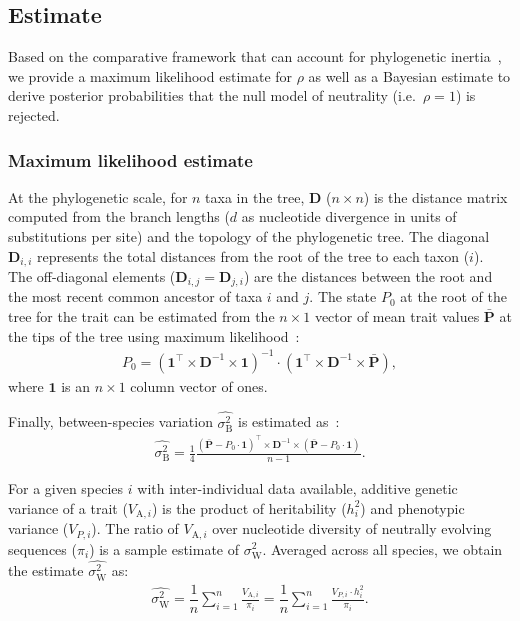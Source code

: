 \documentclass{article}
\newcommand{\Multiply}{\cdot}
\newcommand{\MultiplyMatrix}{\times}
\newcommand{\UniDimArray}[1]{\bm{#1}}
\newcommand{\BiDimArray}[1]{\bm{#1}}
\newcommand{\tr}{^{\intercal}}
\newcommand{\inv}{^{-1}}
\newcommand{\Spi}{i}
\newcommand{\Spj}{j}
\newcommand{\NbrTaxa}{n}
\newcommand{\Trait}{P}
\newcommand{\Heritability}{h^2}
\newcommand{\VecTrait}{\UniDimArray{\bar{\Trait}}}
\newcommand{\Root}{0}
\newcommand{\RootTrait}{\Trait_{\Root}}
\newcommand{\VecOne}{\UniDimArray{1}}
\newcommand{\Distance}{\BiDimArray{D}}
\newcommand{\DistanceMatrix}{\BiDimArray{\Distance}}
\newcommand{\VarGeneticSpi}{V_{\mathrm{A}, \Spi}}
\newcommand{\RateBetween}{\sigma^2_{\mathrm{B}}}
\newcommand{\RateWhithin}{\sigma^2_{\mathrm{W}}}
\newcommand{\EstRateBetween}{\widehat{\RateBetween}}
\newcommand{\EstRateWhithin}{\widehat{\RateWhithin}}
\newcommand{\NI}{\rho}
\begin{document}
\subsection*{Estimate}\label{subsec:estimate}

Based on the comparative framework that can account for phylogenetic inertia~\parencite{felsenstein_phylogenies_1985, omeara_testing_2006}, we provide a maximum likelihood estimate for $\NI$ as well as a Bayesian estimate to derive posterior probabilities that the null model of neutrality (i.e.~$\NI = 1$) is rejected.

\subsubsection*{Maximum likelihood estimate}
At the phylogenetic scale, for $\NbrTaxa$ taxa in the tree, $\DistanceMatrix$ ($\NbrTaxa \times \NbrTaxa$) is the distance matrix computed from the branch lengths ($d$ as nucleotide divergence in units of substitutions per site) and the topology of the phylogenetic tree.
The diagonal $\Distance_{\Spi,\Spi}$ represents the total distances from the root of the tree to each taxon ($\Spi$).
The off-diagonal elements ($\Distance_{\Spi,\Spj} = \Distance_{\Spj,\Spi}$) are the distances between the root and the most recent common ancestor of taxa $\Spi$ and $\Spj$.
The state $\RootTrait$ at the root of the tree for the trait can be estimated from the $\NbrTaxa \times 1$ vector of mean trait values $\VecTrait$ at the tips of the tree using maximum likelihood~\parencite{omeara_testing_2006}:
\begin{gather}
    \RootTrait = \left( \VecOne\tr \MultiplyMatrix \DistanceMatrix\inv \MultiplyMatrix \VecOne \right)\inv \Multiply \left( \VecOne\tr \MultiplyMatrix \DistanceMatrix\inv \MultiplyMatrix \VecTrait \right), \label{eq:estimated-root-trait}
\end{gather}
where $\VecOne$ is an $\NbrTaxa \times 1$ column vector of ones.

Finally, between-species variation $\EstRateBetween$ is estimated as~\parencite{omeara_testing_2006}:
\begin{gather}
    \EstRateBetween = \frac{1}{4}\frac{\left( \VecTrait -  \RootTrait \Multiply \VecOne \right)\tr \MultiplyMatrix \DistanceMatrix\inv \MultiplyMatrix \left( \VecTrait -  \RootTrait \Multiply \VecOne  \right)}{\NbrTaxa - 1}. \label{eq:estimated-rate-phy}
\end{gather}

For a given species $\Spi$ with inter-individual data available, additive genetic variance of a trait ($\VarGeneticSpi$) is the product of heritability ($\Heritability_{i}$) and phenotypic variance ($V_{\Trait, i}$).
The ratio of $\VarGeneticSpi$ over nucleotide diversity of neutrally evolving sequences ($\pi_{\Spi}$) is a sample estimate of $\RateWhithin$.
Averaged across all species, we obtain the estimate $\EstRateWhithin$ as:
\begin{gather}
    \EstRateWhithin = \dfrac{1}{\NbrTaxa}\sum_{i=1}^{\NbrTaxa}\frac{  \VarGeneticSpi}{ \pi_{i}} = \dfrac{1}{\NbrTaxa}\sum_{i=1}^{\NbrTaxa} \frac{  V_{\Trait, i} \Multiply \Heritability_{i}}{ \pi_{i}}. \label{eq:estimated-rate-pop}
\end{gather}
\end{document}
